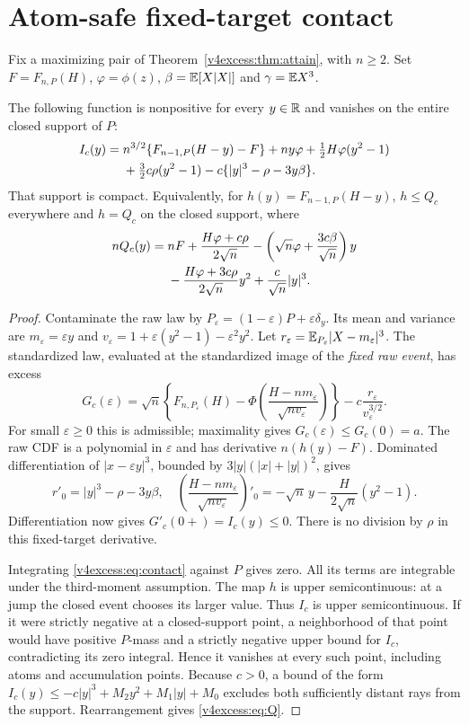 \section{Atom-safe fixed-target contact}
Fix a maximizing pair of Theorem~\ref{v4excess:thm:attain}, with $n\ge2$. Set
$F=F_{n,P}(H)$, $\varphi=\phi(z)$,
$\beta=\mathbb E[X|X|]$ and $\gamma=\mathbb E X^3$.
\begin{theorem}\label{v4excess:thm:contact}
The following function is nonpositive for every $y\in\mathbb R$ and vanishes
on the entire closed support of $P$:
\begin{align}
 I_c(y)={}&n^{3/2}\{F_{n-1,P}(H-y)-F\}+ny\varphi
       +\tfrac12 H\varphi(y^2-1)\notag\\
 &+\tfrac32c\rho(y^2-1)-c\{|y|^3-\rho-3y\beta\}.
 \label{v4excess:eq:contact}
\end{align}
That support is compact. Equivalently, for $h(y)=F_{n-1,P}(H-y)$,
$h\le Q_c$ everywhere and $h=Q_c$ on the closed support, where
\begin{align}
 nQ_c(y)={}&nF+\frac{H\varphi+c\rho}{2\sqrt n}
  -\left(\sqrt n\varphi+\frac{3c\beta}{\sqrt n}\right)y\notag\\
 &-\frac{H\varphi+3c\rho}{2\sqrt n}y^2
  +\frac{c}{\sqrt n}|y|^3.\label{v4excess:eq:Q}
\end{align}
\end{theorem}
\begin{proof}
Contaminate the raw law by
$P_\varepsilon=(1-\varepsilon)P+\varepsilon\delta_y$. Its mean and variance
are $m_\varepsilon=\varepsilon y$ and
$v_\varepsilon=1+\varepsilon(y^2-1)-\varepsilon^2y^2$.
Let $r_\varepsilon=\mathbb E_{P_\varepsilon}|X-m_\varepsilon|^3$. The standardized
law, evaluated at the standardized image of the \emph{fixed raw event},
has excess
\[
 G_c(\varepsilon)=\sqrt n\left\{F_{n,P_\varepsilon}(H)
 -\Phi\!\left(\frac{H-nm_\varepsilon}{\sqrt{nv_\varepsilon}}\right)\right\}
 -c\frac{r_\varepsilon}{v_\varepsilon^{3/2}}.
\]
For small $\varepsilon\ge0$ this is admissible; maximality gives
$G_c(\varepsilon)\le G_c(0)=a$. The raw CDF is a polynomial in
$\varepsilon$ and has derivative $n(h(y)-F)$. Dominated differentiation
of $|x-\varepsilon y|^3$, bounded by
$3|y|(|x|+|y|)^2$, gives
\[
 r'_0=|y|^3-\rho-3y\beta,
 \quad \left(\frac{H-nm_\varepsilon}{\sqrt{nv_\varepsilon}}\right)'_0
 =-\sqrt n\,y-\frac{H}{2\sqrt n}(y^2-1).
\]
Differentiation now gives $G'_c(0+)=I_c(y)\le0$. There is no division by
$\rho$ in this fixed-target derivative.

Integrating \eqref{v4excess:eq:contact} against $P$ gives zero. All its terms are
integrable under the third-moment assumption. The map $h$ is upper
semicontinuous: at a jump the closed event chooses its larger value.
Thus $I_c$ is upper semicontinuous. If it were strictly negative at a
closed-support point, a neighborhood of that point would have positive
$P$-mass and a strictly negative upper bound for $I_c$, contradicting its
zero integral. Hence it vanishes at every such point, including atoms and
accumulation points. Because $c>0$, a bound of the form
$I_c(y)\le-c|y|^3+M_2y^2+M_1|y|+M_0$ excludes both sufficiently distant
rays from the support. Rearrangement gives \eqref{v4excess:eq:Q}.
\end{proof}

